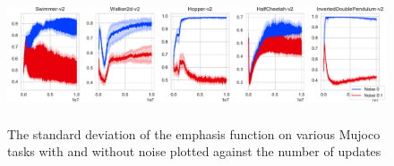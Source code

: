 \begin{figure}[H]
    \centering
    \includegraphics[width=\textwidth, height=4cm]{fig/beta_mean_a2c_mujoco_sea_steps_5_noise_obs_0_1.pdf}
    \caption{The standard deviation of the emphasis function on various Mujoco tasks with and without noise plotted against the number of updates}
    \label{fig:beta_std_a2c_mujoco}
\end{figure}



 